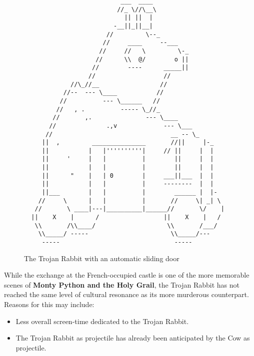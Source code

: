 \documentclass{metanorma}
\newenvironment{aside}{}{}
\begin{document}
\begin{figure}
  \label{trojan-rabbit}
  \caption{The Trojan Rabbit with an automatic sliding door}
\begin{verbatim}
                           ___  ____
                          //_ \//\__\
                            || ||  |
                         -__||_||__|
                       //         \--_
                      //     ____     --___
                     //     //   \         \-_
                    //      \\  @/        o ||
                   //        ----      _____||
                  //                   //
             //\_//__                 //
           //--  --- \____           //
          //          --- \______   //
         //   , .          ----- \_//_
        //       ,.               --- \____
       //              .,v             --- \___
      //                                 __ -- \_
     ||  ,         _______________       //||     |-_
     ||           |   |''''''''''|     // ||     |  |
     ||     '     |   |          |        ||     |  |
     ||           |   |          |        ||     |  |
     ||      "    |   | 0        |     ___||___  |  |
     ||           |   |          |     --------  |  |
     ||___        |   |          |        ______ |  |-
    //     \      |   |          |       //     \| _| \
   //       \ ____|---|__________|______//       \/    |
  ||    X    |      /                  ||    X    |   /
   \\       /\\____/                    \\       /___/
    \\_____/ -----                       \\_____/---
     -----                                -----
\end{verbatim}
\end{figure}


\begin{aside}
  While the exchange at the French-occupied castle is one of
  the more memorable scenes of 
  \textbf{Monty Python and the Holy Grail},
  the Trojan Rabbit has not reached the same level of cultural
  resonance as its more murderous counterpart. Reasons for this
  may include:

  \begin{itemize}
    \item Less overall screen-time dedicated to the Trojan Rabbit.
    \item The Trojan Rabbit as projectile has already been anticipated
    by the Cow as projectile.
  \end{itemize}
\end{aside}
\end{document}
